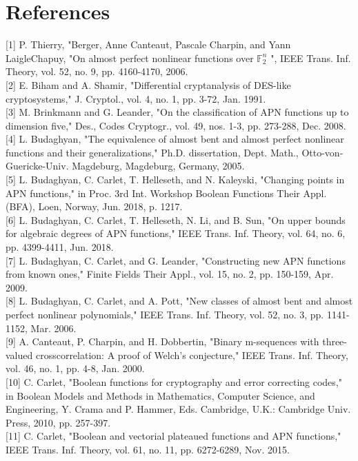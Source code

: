 \documentclass[10pt]{article}
\begin{document}
\section*{References}
[1] P. Thierry, "Berger, Anne Canteaut, Pascale Charpin, and Yann LaigleChapuy, "On almost perfect nonlinear functions over $\mathbb{F}_{2}^{n}$ ", IEEE Trans. Inf. Theory, vol. 52, no. 9, pp. 4160-4170, 2006.\\[0pt]
[2] E. Biham and A. Shamir, "Differential cryptanalysis of DES-like cryptosystems," J. Cryptol., vol. 4, no. 1, pp. 3-72, Jan. 1991.\\[0pt]
[3] M. Brinkmann and G. Leander, "On the classification of APN functions up to dimension five," Des., Codes Cryptogr., vol. 49, nos. 1-3, pp. 273-288, Dec. 2008.\\[0pt]
[4] L. Budaghyan, "The equivalence of almost bent and almost perfect nonlinear functions and their generalizations," Ph.D. dissertation, Dept. Math., Otto-von-Guericke-Univ. Magdeburg, Magdeburg, Germany, 2005.\\[0pt]
[5] L. Budaghyan, C. Carlet, T. Helleseth, and N. Kaleyski, "Changing points in APN functions," in Proc. 3rd Int. Workshop Boolean Functions Their Appl. (BFA), Loen, Norway, Jun. 2018, p. 1217.\\[0pt]
[6] L. Budaghyan, C. Carlet, T. Helleseth, N. Li, and B. Sun, "On upper bounds for algebraic degrees of APN functions," IEEE Trans. Inf. Theory, vol. 64, no. 6, pp. 4399-4411, Jun. 2018.\\[0pt]
[7] L. Budaghyan, C. Carlet, and G. Leander, "Constructing new APN functions from known ones," Finite Fields Their Appl., vol. 15, no. 2, pp. 150-159, Apr. 2009.\\[0pt]
[8] L. Budaghyan, C. Carlet, and A. Pott, "New classes of almost bent and almost perfect nonlinear polynomials," IEEE Trans. Inf. Theory, vol. 52, no. 3, pp. 1141-1152, Mar. 2006.\\[0pt]
[9] A. Canteaut, P. Charpin, and H. Dobbertin, "Binary m-sequences with three-valued crosscorrelation: A proof of Welch's conjecture," IEEE Trans. Inf. Theory, vol. 46, no. 1, pp. 4-8, Jan. 2000.\\[0pt]
[10] C. Carlet, "Boolean functions for cryptography and error correcting codes," in Boolean Models and Methods in Mathematics, Computer Science, and Engineering, Y. Crama and P. Hammer, Eds. Cambridge, U.K.: Cambridge Univ. Press, 2010, pp. 257-397.\\[0pt]
[11] C. Carlet, "Boolean and vectorial plateaued functions and APN functions," IEEE Trans. Inf. Theory, vol. 61, no. 11, pp. 6272-6289, Nov. 2015.\\[0pt]
\end{document}
